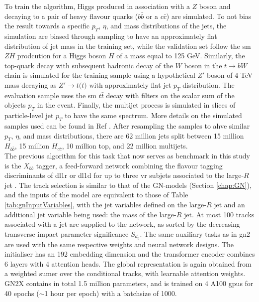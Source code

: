 To train the algorithm, Higgs produced in association with a $Z$ boson and decaying to a pair of heavy flavour quarks ($b\bar{b}$ or a $c\bar{c}$) are simulated. To not bias the result towards a specific $p_T$, $\eta$, and mass distributions of the jets, the simulation are biased through sampling to have an approximately flat distribution of jet mass in the training set, while the validation set follow the \gls{sm} $ZH$ prodcution for a Higgs boson $H$ of a mass equal to 125 GeV. Similarly, the top-quark decay with subsequent hadronic decay of the $W$ boson in the $t \rightarrow bW$ chain is simulated for the training sample using a hypothetical $Z'$ boson of 4 TeV mass decaying as $Z' \rightarrow t\bar(t)$ with approximately flat jet $p_T$ distribution. The evaluation sample uses the \gls{sm} $t\bar{t}$ decay with filters on the scalar sum of the objects $p_T$ in the event. Finally, the multijet process is simulated in slices of particle-level jet $p_T$ to have the same spectrum. More details on the simulated samples used can be found in Ref \cite{ATL-PHYS-PUB-2023-021}. After resampling the samples to ahve similar $p_T$, $\eta$, and mass distributions, there are 62 million jets split between 15 million $H_{b\bar{b}}$, 15 million $H_{c\bar{c}}$, 10 million top, and 22 million multijets. \\

The previous algorithm for this task that now serves as benchmark in this study is the $X_{bb}$ tagger, a feed-forward network combining the flavour tagging discriminants of \gls{dl1r} or \gls{dl1d} for up to three \gls{vr} subjets associated to the large-$R$ jet \cite{ATL-PHYS-PUB-2020-019, ATL-PHYS-PUB-2021-035}. The track selection is similar to that of the GN-models (Section \ref{chap:GN}), and the inputs of the model are equivalent to those of Table \ref{tab:gnInputVariables}, with the jet variables defined on the large-$R$ jet and an additional jet variable being used: the mass of the large-$R$ jet. At most 100 tracks associated with a jet are supplied to the network, as sorted by the decreasing transverse impact parameter significance $S_{d_0}$. The same auxiliary tasks as in \gls{gn2} are used with the same respective weights and neural network designs. The initialiser has an 192 embedding dimension and the transformer encoder combines 6 layers with 4 attention heads. The global representation is again obtained from a weighted sumer over the conditional tracks, with learnable attention weights. GN2X contains in total 1.5 million parameters, and is trained on 4 A100 \gls{gpu}s for 40 epochs ($\sim$1 hour per epoch) with a batchsize of 1000. 


